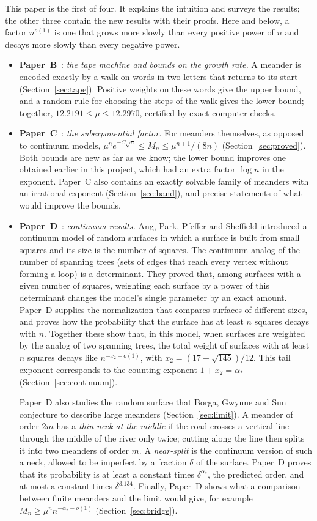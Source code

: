This paper is the first of four. It explains the intuition and surveys the results; the other
three contain the new results with their proofs. Here and below, a factor $n^{o(1)}$ is one that
grows more slowly than every positive power of $n$ and decays more slowly than every negative
power.
\begin{itemize}
\item \textbf{Paper~B}~\cite{PaperB}: \emph{the tape machine and bounds on the growth rate.} A
meander is encoded exactly by a walk on words in two letters that returns to its start
(Section~\ref{sec:tape}). Positive weights on these words give the upper bound, and a random rule
for choosing the steps of the walk gives the lower bound; together,
$12.2191\le\mu\le12.2970$, certified by exact computer checks.
\item \textbf{Paper~C}~\cite{PaperC}: \emph{the subexponential factor.} For meanders themselves,
as opposed to continuum models, $\mu^n e^{-C\sqrt n}\le M_n\le \mu^{n+1}/(8n)$
(Section~\ref{sec:proved}). Both bounds are new as far as we know; the lower bound improves one
obtained earlier in this project, which had an extra factor $\log n$ in the exponent. Paper~C also
contains an exactly solvable family of meanders with an irrational exponent
(Section~\ref{sec:band}), and precise statements of what would improve the bounds.
\item \textbf{Paper~D}~\cite{PaperD}: \emph{continuum results.} Ang, Park, Pfeffer and Sheffield
introduced a continuum model of random surfaces in which a surface is built from small squares
and its size is the number of squares. The continuum analog of the number of spanning trees (sets
of edges that reach every vertex without forming a loop) is a determinant. They proved that, among
surfaces with a given number of squares, weighting each surface by a power of this determinant
changes the model's single parameter by an exact amount. Paper~D supplies the normalization that
compares surfaces of different sizes, and proves how the probability that the surface has at least
$n$ squares decays with $n$. Together these show that, in this model, when surfaces are weighted
by the analog of two spanning trees, the total weight of surfaces with at least $n$ squares decays
like $n^{-x_2+o(1)}$, with $x_2=(17+\sqrt{145})/12$. This tail exponent corresponds to the
counting exponent $1+x_2=\alpha_*$ (Section~\ref{sec:continuum}).

Paper~D also studies the random surface that Borga, Gwynne and Sun conjecture to describe large
meanders (Section~\ref{sec:limit}). A meander of order $2m$ has a \emph{thin neck at the middle}
if the road crosses a vertical line through the middle of the river only twice; cutting along
the line then splits it into two meanders of order $m$. A \emph{near-split} is the continuum
version of such a neck, allowed to be imperfect by a fraction $\delta$ of the surface. Paper~D
proves that its probability is at least a constant times $\delta^{\alpha_*}$, the predicted
order, and at most a constant times $\delta^{3.134}$. Finally, Paper~D shows what a comparison
between finite meanders and the limit would give, for example
$M_n\ge\mu^n n^{-\alpha_*-o(1)}$ (Section~\ref{sec:bridge}).
\end{itemize}
